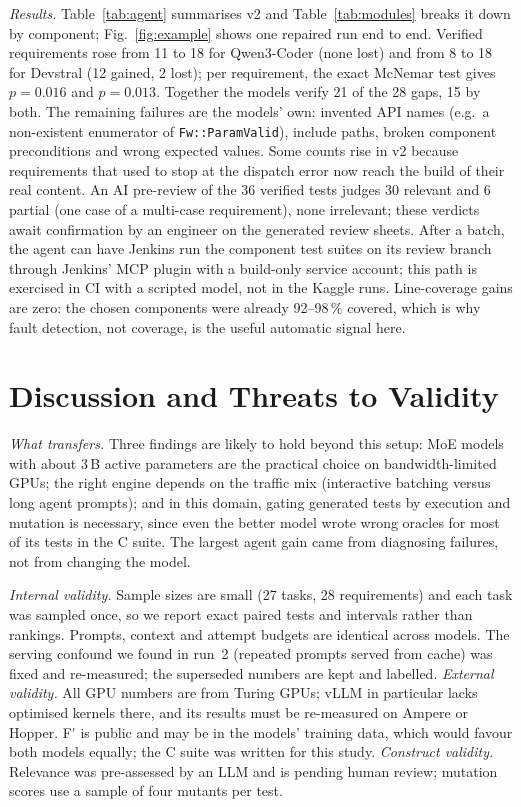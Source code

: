 \documentclass[conference]{IEEEtran}
\newcommand{\Fp}{F\'{}}  %
\newcommand{\tool}[1]{\texttt{#1}}
\begin{document}
\emph{Results.} Table~\ref{tab:agent} summarises v2 and Table~\ref{tab:modules} breaks it down by component;
Fig.~\ref{fig:example} shows one repaired run end to end. Verified requirements rose from 11 to 18 for Qwen3-Coder
(none lost) and from 8 to 18 for Devstral (12 gained, 2 lost); per requirement, the exact McNemar test gives
$p = 0.016$ and $p = 0.013$. Together the models verify 21 of the 28 gaps, 15 by both. The remaining failures are the
models' own: invented API names (e.g.\ a non-existent enumerator of \tool{Fw::ParamValid}), include paths,
broken component preconditions and wrong expected values. Some counts rise in v2 because requirements that used to
stop at the dispatch error now reach the build of their real content. An AI pre-review of the 36 verified tests
judges 30 relevant and 6 partial (one case of a multi-case requirement), none irrelevant; these verdicts await
confirmation by an engineer on the generated review sheets. After a batch, the agent can have Jenkins run the
component test suites on its review branch through Jenkins' MCP plugin with a build-only service account; this
path is exercised in CI with a scripted model, not in the Kaggle runs. Line-coverage gains are zero: the chosen components
were already 92--98\,\% covered, which is why fault detection, not coverage, is the useful automatic signal here.

\section{Discussion and Threats to Validity}
\emph{What transfers.} Three findings are likely to hold beyond this setup: MoE models with about 3\,B active
parameters are the practical choice on bandwidth-limited GPUs; the right engine depends on the traffic mix
(interactive batching versus long agent prompts); and in this domain, gating generated tests by execution and
mutation is necessary, since even the better model wrote wrong oracles for most of its tests in the C suite.
The largest agent gain came from diagnosing failures, not from changing the model.

\emph{Internal validity.} Sample sizes are small (27 tasks, 28 requirements) and each task was sampled once, so
we report exact paired tests and intervals rather than rankings. Prompts, context and attempt budgets are identical
across models. The serving confound we found in run~2 (repeated prompts served from cache) was fixed and
re-measured; the superseded numbers are kept and labelled. \emph{External validity.} All GPU numbers are from
Turing GPUs; vLLM in particular lacks optimised kernels there, and its results must be re-measured on Ampere or
Hopper. \Fp{} is public and may be in the models' training data, which would favour both models equally; the C
suite was written for this study. \emph{Construct validity.} Relevance was pre-assessed by an LLM and is pending
human review; mutation scores use a sample of four mutants per test.
\end{document}
